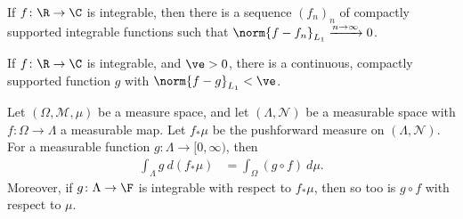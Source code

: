 \begin{corollary}
  If $f\colon \R\rightarrow\C$ is integrable, then there is a sequence $\left(f_n\right)_n$ of compactly supported integrable functions such that $\norm{f - f_n}_{L_1}\xrightarrow{n\rightarrow\infty} 0$.
\end{corollary}
\begin{theorem}
  If $f\colon \R\rightarrow\C$ is integrable, and $\ve > 0$, there is a continuous, compactly supported function $g$ with $\norm{f - g}_{L_1} < \ve$.
\end{theorem}
\begin{proposition}
  Let $\left(\Omega,\mathcal{M},\mu\right)$ be a measure space, and let $\left(\Lambda,\mathcal{N}\right)$ be a measurable space with $f\colon \Omega\rightarrow \Lambda$ a measurable map. Let $f_{\ast}\mu$ be the pushforward measure on $\left(\Lambda,\mathcal{N}\right)$. For a measurable function $g\colon \Lambda\rightarrow [0,\infty)$, then
  \begin{align*}
    \int_{\Lambda}^{} g\:d\left(f_{\ast}\mu\right) &= \int_{\Omega}^{} \left(g\circ f\right)\:d\mu.
  \end{align*}
  Moreover, if $g\colon \Lambda\rightarrow \F$ is integrable with respect to $f_{\ast}\mu$, then so too is $g\circ f$ with respect to $\mu$.
\end{proposition}
